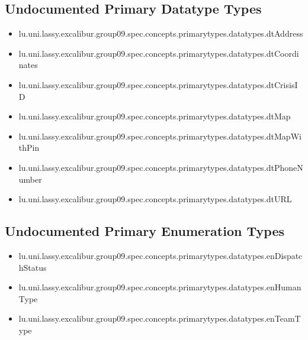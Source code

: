 \subsection[Undocumented Primary Datatype Types]{Undocumented Primary Datatype Types}
\begin{itemize}
\item lu.uni.lassy.excalibur.group09.spec.concepts.primarytypes.datatypes.dtAddress 
\item lu.uni.lassy.excalibur.group09.spec.concepts.primarytypes.datatypes.dtCoordinates 
\item lu.uni.lassy.excalibur.group09.spec.concepts.primarytypes.datatypes.dtCrisisID 
\item lu.uni.lassy.excalibur.group09.spec.concepts.primarytypes.datatypes.dtMap 
\item lu.uni.lassy.excalibur.group09.spec.concepts.primarytypes.datatypes.dtMapWithPin 
\item lu.uni.lassy.excalibur.group09.spec.concepts.primarytypes.datatypes.dtPhoneNumber 
\item lu.uni.lassy.excalibur.group09.spec.concepts.primarytypes.datatypes.dtURL 
\end{itemize}

\subsection[Undocumented Primary Enumeration Types]{Undocumented Primary Enumeration Types}
\begin{itemize}
\item lu.uni.lassy.excalibur.group09.spec.concepts.primarytypes.datatypes.enDispatchStatus 
\item lu.uni.lassy.excalibur.group09.spec.concepts.primarytypes.datatypes.enHumanType 
\item lu.uni.lassy.excalibur.group09.spec.concepts.primarytypes.datatypes.enTeamType 
\end{itemize}
















